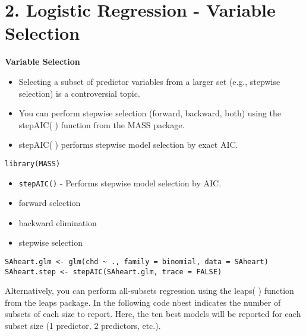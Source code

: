 \documentclass{beamer}
\begin{document}
\section*{2. Logistic Regression - Variable Selection}
\begin{frame}[fragile]
\textbf{Variable Selection}
\begin{itemize}
\item Selecting a subset of predictor variables from a larger set (e.g., stepwise selection) is a controversial topic. 
\item You can perform stepwise selection (forward, backward, both) using the stepAIC( ) function from the MASS package.
\item stepAIC( ) performs stepwise model selection by exact AIC.
\end{itemize}


\begin{verbatim}
library(MASS)
\end{verbatim}


\end{frame}
\begin{frame}[fragile]

\begin{itemize}
\item \texttt{stepAIC()} - Performs stepwise model selection by AIC.
\end{itemize}

\begin{itemize}
\item forward selection
\item backward elimination
\item stepwise selection
\end{itemize}
\end{frame}
\begin{frame}[fragile]

\begin{framed}
\begin{verbatim}
SAheart.glm <- glm(chd ~ ., family = binomial, data = SAheart)
SAheart.step <- stepAIC(SAheart.glm, trace = FALSE)
\end{verbatim}
\end{framed}
Alternatively, you can perform all-subsets regression using the leaps( ) function from the leaps package. In the following code nbest indicates the number of subsets of each size to report. Here, the ten best models will be reported for each subset size (1 predictor, 2 predictors, etc.).
\end{frame}
\end{document}
